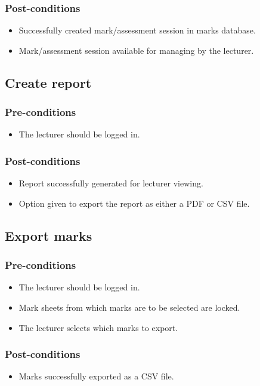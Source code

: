 \subsubsection{Post-conditions}
\begin{itemize}
\item Successfully created mark/assessment session in marks database.
\item Mark/assessment session available for managing by the lecturer.
\end{itemize}

\subsection{Create report}
\subsubsection{Pre-conditions}
\begin{itemize}
\item The lecturer should be logged in.
\end{itemize}
\subsubsection{Post-conditions}
\begin{itemize}
\item Report successfully generated for lecturer viewing.
\item Option given to export the report as either a PDF or CSV file.
\end{itemize}

\subsection{Export marks}
\subsubsection{Pre-conditions}
\begin{itemize}
\item The lecturer should be logged in.
\item Mark sheets from which marks are to be selected are locked.
\item The lecturer selects which marks to export.
\end{itemize}
\subsubsection{Post-conditions}
\begin{itemize}
\item Marks successfully exported as a CSV file.
\end{itemize}

